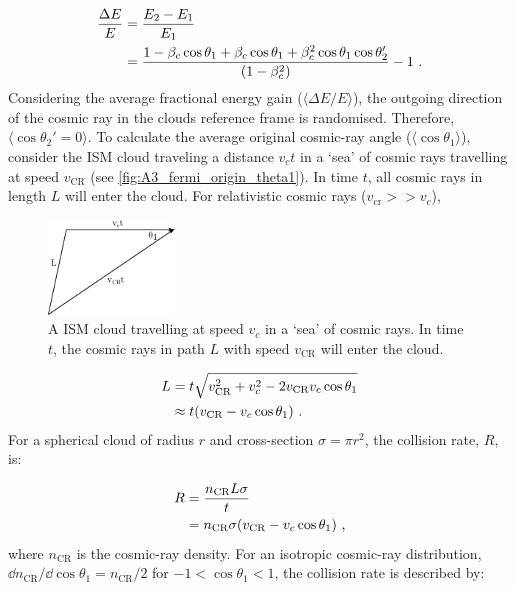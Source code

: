 \begin{equation}
    \begin{aligned}
        \frac{\Delta E}{E}&=\frac{E_2-E_1}{E_1} \\
        &=\frac{1-\beta_c\cos\theta_1+\beta_c\cos\theta_1+\beta_c^2\cos\theta_1\cos\theta_2'}{\qty(1-\beta_c^2)}-1\text{ .}
    \end{aligned} \label{eq:A3_DSA_fermi_orig_frac_energy}
\end{equation}
\noindent Considering the average fractional energy gain ($\langle \Delta E/E \rangle$), the outgoing direction of the cosmic ray in the clouds reference frame is randomised. Therefore, $\langle \cos\theta_2'=0 \rangle$. To calculate the average original cosmic-ray angle ($\langle \cos\theta_1 \rangle$), consider the ISM cloud traveling a distance $v_ct$ in a `sea' of cosmic rays travelling at speed $v_\text{CR}$ (see \autoref{fig:A3_fermi_origin_theta1}). In time $t$, all cosmic rays in length $L$ will enter the cloud. For relativistic cosmic rays ($v_\text{cr}>>v_c$),
\begin{figure}
    \centering
    \includegraphics[width=0.3\textwidth]{A3_Diffusive_Shock_Acceleration/Images/fermi_original_theta1.pdf}
    \caption{A ISM cloud travelling at speed $v_c$ in a `sea' of cosmic rays. In time $t$, the cosmic rays in path $L$ with speed $v_\text{CR}$ will enter the cloud.}
    \label{fig:A3_fermi_origin_theta1}
\end{figure}
\begin{equation}
    \begin{aligned}
        L&=t\sqrt{v_\text{CR}^2+v_c^2-2v_\text{CR}v_c\cos\theta_1} \\
        &\approx t\qty(v_\text{CR}-v_c\cos\theta_1) \text{ .}
    \end{aligned}
\end{equation}
\noindent For a spherical cloud of radius $r$ and cross-section $\sigma=\pi r^2$, the collision rate, $R$, is:

\begin{equation}
    \begin{aligned}
        R&=\frac{n_\text{CR}L\sigma}{t} \\
        &=n_\text{CR}\sigma\qty(v_\text{CR}-v_c\cos\theta_1) \text { ,}
    \end{aligned}
\end{equation}
\noindent where $n_\text{CR}$ is the cosmic-ray density. For an isotropic cosmic-ray distribution, $\dd{n_\text{CR}}/\dd{\cos\theta_1}=n_\text{CR}/2$ for $-1<\cos\theta_1<1$, the collision rate is described by:

